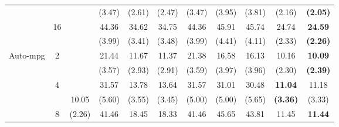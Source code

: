 \documentclass[letterpaper]{article} %
\begin{document}
\begin{table}[!t]
{\begin{tabular}{clcccccccc|cc}
\multicolumn{2}{c}{}                             &                       &                             & (3.47)                    & (2.61)                    & (2.47)                      & (3.47)                    & (3.95)                    & (3.81)                      & (2.16)              & \textbf{(2.05)}       \\
\multicolumn{2}{c}{}                             & \multirow{2}{*}{16}   &                             & 44.36                     & 34.62                     & 34.75                       & 44.36                     & 45.91                     & 45.74                       & 24.74               & \textbf{24.59}        \\
\multicolumn{2}{c}{}                             &                       &                             & (3.99)                    & (3.41)                    & (3.48)                      & (3.99)                    & (4.41)                    & (4.11)                      & (2.33)              & \textbf{(2.26)}       \\ \hline
\multicolumn{2}{c}{\multirow{8}{*}{Auto-mpg}}    & \multirow{2}{*}{2}    &                             & 21.44                     & 11.67                     & 11.37                       & 21.38                     & 16.58                     & 16.13                       & 10.16               & \textbf{10.09}        \\
\multicolumn{2}{c}{}                             &                       &                             & (3.57)                    & (2.93)                    & (2.91)                      & (3.59)                    & (3.97)                    & (3.96)                      & (2.30)              & \textbf{(2.39)}       \\
\multicolumn{2}{c}{}                             & \multirow{2}{*}{4}    &                             & 31.57                     & 13.78                     & 13.64                       & 31.57                     & 31.01                     & 30.48                       & \textbf{11.04}      & 11.18                 \\
\multicolumn{2}{c}{}                             &                       & 10.05                       & (5.60)                    & (3.55)                    & (3.45)                      & (5.00)                    & (5.00)                    & (5.65)                      & \textbf{(3.36)}     & (3.33)                \\
\multicolumn{2}{c}{}                             & \multirow{2}{*}{8}    & (2.26)                      & 41.46                     & 18.45                     & 18.33                       & 41.46                     & 45.65                     & 43.81                       & 11.45               & \textbf{11.44}        \\

\end{tabular}}
\end{table}
\end{document}
